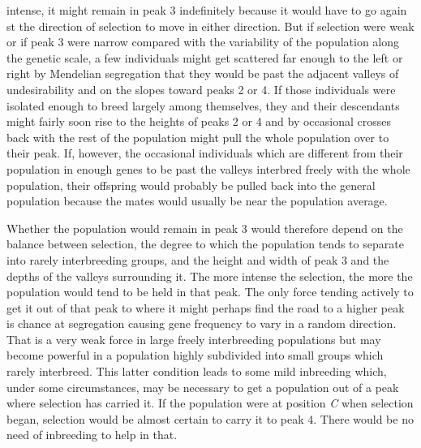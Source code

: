 intense, it might remain in peak 3 indefinitely because it would have to
go again st the direction of selection to move in either direction. But if
selection were weak or if peak 3 were narrow compared with the variability
of the population along the genetic scale, a few individuals might
get scattered far enough to the left or right by Mendelian segregation
that they would be past the adjacent valleys of undesirability and on the
slopes toward peaks 2 or 4. If those individuals were isolated enough to
breed largely among themselves, they and their descendants might
fairly soon rise to the heights of peaks 2 or 4 and by occasional crosses
back with the rest of the population might pull the whole population
over to their peak. If, however, the occasional individuals which are
different from their population in enough genes to be past the valleys
interbred freely with the whole population, their offspring would probably
be pulled back into the general population because the mates
would usually be near the population average.

Whether the population would remain in peak 3 would therefore
depend on the balance between selection, the degree to which the population
tends to separate into rarely interbreeding groups, and the height
and width of peak 3 and the depths of the valleys surrounding it. The
more intense the selection, the more the population would tend to be
held in that peak. The only force tending actively to get it out of that
peak to where it might perhaps find the road to a higher peak is chance
at segregation causing gene frequency to vary in a random direction.
That is a very weak force in large freely interbreeding populations but
may become powerful in a population highly subdivided into small
groups which rarely interbreed. This latter condition leads to some
mild inbreeding which, under some circumstances, may be necessary to
get a population out of a peak where selection has carried it. If the
population were at position \textit{C} when selection began, selection would be
almost certain to carry it to peak 4. There would be no need of inbreeding
to help in that.

